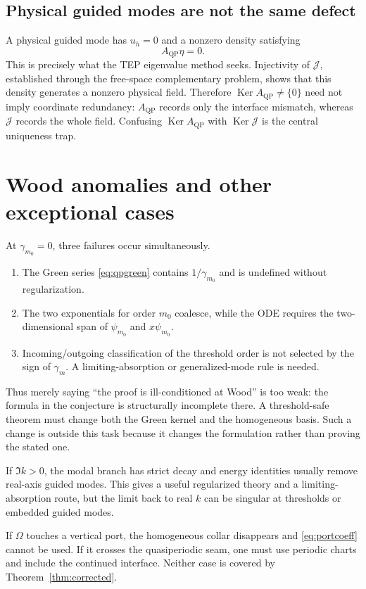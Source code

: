 \documentclass[11pt]{article}
\newcommand{\Om}{\Omega}
\newcommand{\QP}{\mathrm{QP}}
\newcommand{\Ker}{\operatorname{Ker}}
\theoremstyle{plain}
\theoremstyle{definition}
\theoremstyle{remark}
\begin{document}
\subsection{Physical guided modes are not the same defect}

A physical guided mode has \(u_h=0\) and a nonzero density satisfying
\[
A_{\QP}\eta=0.
\]
This is precisely what the TEP eigenvalue method seeks.  Injectivity of
\(\mathcal J\), established through the free-space complementary problem,
shows that this density generates a nonzero physical field.  Therefore
\(\Ker A_{\QP}\neq\{0\}\) need not imply coordinate redundancy: \(A_{\QP}\)
records only the interface mismatch, whereas \(\mathcal J\) records the whole
field.  Confusing \(\Ker A_{\QP}\) with \(\Ker\mathcal J\) is the central
uniqueness trap.

\section{Wood anomalies and other exceptional cases}

At \(\gamma_{m_0}=0\), three failures occur simultaneously.

\begin{enumerate}
\item The Green series \eqref{eq:qpgreen} contains \(1/\gamma_{m_0}\) and is
undefined without regularization.
\item The two exponentials for order \(m_0\) coalesce, while the ODE requires
the two-dimensional span of \(\psi_{m_0}\) and \(x\psi_{m_0}\).
\item Incoming/outgoing classification of the threshold order is not selected
by the sign of \(\gamma_m\).  A limiting-absorption or generalized-mode rule is
needed.
\end{enumerate}

Thus merely saying ``the proof is ill-conditioned at Wood'' is too weak: the
formula in the conjecture is structurally incomplete there.  A threshold-safe
theorem must change both the Green kernel and the homogeneous basis.  Such a
change is outside this task because it changes the formulation rather than
proving the stated one.

If \(\Im k>0\), the modal branch has strict decay and energy identities usually
remove real-axis guided modes.  This gives a useful regularized theory and a
limiting-absorption route, but the limit back to real \(k\) can be singular at
thresholds or embedded guided modes.

If \(\Om\) touches a vertical port, the homogeneous collar disappears and
\eqref{eq:portcoeff} cannot be used.  If it crosses the quasiperiodic seam, one
must use periodic charts and include the continued interface.  Neither case is
covered by Theorem~\ref{thm:corrected}.
\end{document}
